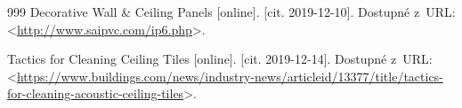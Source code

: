 \begin{thebibliography}{999}
	Decorative Wall \& Ceiling Panels [online]. [cit. 2019-12-10]. Dostupné z~URL:\\ 
<\url{http://www.saipvc.com/ip6.php}>.

	Tactics for Cleaning Ceiling Tiles [online]. [cit. 2019-12-14]. Dostupné z~URL:\\ 
<\url{https://www.buildings.com/news/industry-news/articleid/13377/title/tactics-for-cleaning-acoustic-ceiling-tiles}>.

	




\end{thebibliography}


%
%
%
